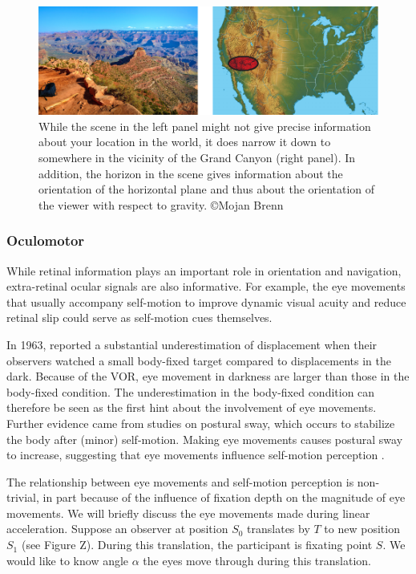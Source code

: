 \begin{figure}
    \includegraphics[width=1.0\textwidth]{src/intro/figures/Canyon.pdf}

    \caption{While the scene in the left panel might not give precise information about your location in the world, it does narrow it down to somewhere in the vicinity of the Grand Canyon (right panel). In addition, the horizon in the scene gives information about the orientation of the horizontal plane and thus about the orientation of the viewer with respect to gravity. \copyright Mojan Brenn}
    \label{intro:fig1}
\end{figure}


\subsubsection{Oculomotor}
While retinal information plays an important role in orientation and navigation, extra-retinal ocular signals are also informative. For example, the eye movements that usually accompany self-motion to improve dynamic visual acuity and reduce retinal slip could serve as self-motion cues themselves. 

In 1963, \citeauthor{guedry1963} reported a substantial underestimation of displacement when their observers watched a small body-fixed target compared to displacements in the dark. Because of the VOR, eye movement in darkness are larger than those in the body-fixed condition. The underestimation in the body-fixed condition can therefore be seen as the first hint about the involvement of eye movements. Further evidence came from studies on postural sway, which occurs to stabilize the body after (minor) self-motion. Making eye movements causes postural sway to increase, suggesting that eye movements influence self-motion perception \cite{glasauer2005,rodrigues2015}.

The relationship between eye movements and self-motion perception is non-trivial, in part because of the influence of fixation depth on the magnitude of eye movements. We will briefly discuss the eye movements made during linear acceleration. Suppose an observer at position $S_0$ translates by $T$ to new position $S_1$ (see Figure Z). During this translation, the participant is fixating point $S$. We would like to know angle $\alpha$ the eyes move through during this translation.  

